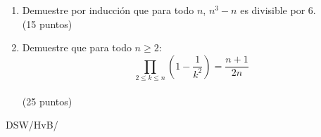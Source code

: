 \documentclass[spanish, fleqn]{article}
\begin{document}
\begin{enumerate}
\begin{enumerate}
      \(\mathcal{A} \not\subseteq \mathcal{B},
	\mathcal{B} \subseteq \mathcal{C},
	\mathcal{A} \subseteq \mathcal{C}\)
    \end{enumerate}
    \hspace*{\fill}(30 puntos)
  \item
    Demuestre por inducción que para todo \(n\),
    \(n^3 - n\) es divisible por \(6\).
    \\ \hspace*{\fill}(15 puntos)
  \item
    Demuestre que para todo \(n \ge 2\):
    \begin{equation*}
      \prod_{2 \le k \le n} \left( 1 - \frac{1}{k^2} \right)
	= \frac{n + 1}{2 n}
    \end{equation*}
    \\ \hspace*{\fill}(25 puntos)
  \end{enumerate}


  \vfill\hfill DSW/HvB/\LaTeXe
\end{document}
